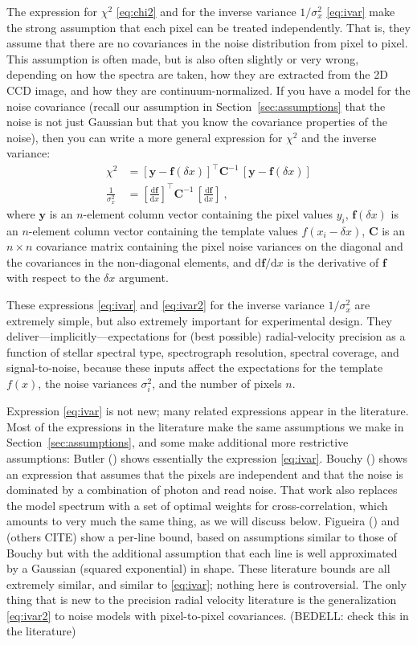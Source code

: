 \documentclass[modern]{aastex631}
\newcommand{\dd}{\mathrm{d}}
\newcommand{\lao}[1]{\boldsymbol{#1}}
\newcommand{\vy}{\lao{y}}
\newcommand{\vf}{\lao{f}}
\newcommand{\vC}{\lao{C}}
\newcommand{\sectionname}{Section}
\newcommand{\secref}[1]{\sectionname~\ref{#1}}
\begin{document}
The expression for $\chi^2$ \eqref{eq:chi2} and for the inverse variance $1/\sigma_x^2$ \eqref{eq:ivar} make the strong assumption that each pixel can be treated independently.
That is, they assume that there are no covariances in the noise distribution from pixel to pixel.
This assumption is often made, but is also often slightly or very wrong, depending on how the spectra are taken, how they are extracted from the 2D CCD image, and how they are continuum-normalized.
If you have a model for the noise covariance (recall our assumption in \secref{sec:assumptions} that the noise is not just Gaussian but that you know the covariance properties of the noise), then you can write a more general expression for $\chi^2$ and the inverse variance:
\begin{align}
    \chi^2 &= [\vy - \vf(\delta x)]^\top\vC^{-1}\,[\vy - \vf(\delta x)]\\
    \frac{1}{\sigma_x^2} &= \left[\frac{\dd\vf}{\dd x}\right]^\top\vC^{-1}\,\left[\frac{\dd\vf}{\dd x}\right]\label{eq:ivar2} ~,
\end{align}
where $\vy$ is an $n$-element column vector containing the pixel values $y_i$,
$\vf(\delta x)$ is an $n$-element column vector containing the template values $f(x_i-\delta x)$,
$\vC$ is an $n\times n$ covariance matrix containing the pixel noise variances on the diagonal and the covariances in the non-diagonal elements,
and $\dd\vf/\dd x$ is the derivative of $\vf$ with respect to the $\delta x$ argument.

These expressions \eqref{eq:ivar} and \eqref{eq:ivar2} for the inverse variance $1/\sigma_x^2$ are extremely simple, but also extremely important for experimental design.
They deliver---implicitly---expectations for (best possible) radial-velocity precision as a function of stellar spectral type, spectrograph resolution, spectral coverage, and signal-to-noise, because these inputs affect the expectations for the template $f(x)$, the noise variances $\sigma_i^2$, and the number of pixels $n$.

Expression \eqref{eq:ivar} is not new; many related expressions appear in the literature.
Most of the expressions in the literature make the same assumptions we make in \secref{sec:assumptions}, and some make additional more restrictive assumptions:
Butler (\citealt{Butler}) shows essentially the expression \eqref{eq:ivar}.
Bouchy (\citealt{Bouchy}) shows an expression that assumes that the pixels are independent and that the noise is dominated by a combination of photon and read noise. 
That work also replaces the model spectrum with a set of optimal weights for cross-correlation, which amounts to very much the same thing, as we will discuss below.
Figueira (\citealt{figuera}) and (others CITE) show a per-line bound, based on assumptions similar to those of Bouchy but with the additional assumption that each line is well approximated by a Gaussian (squared exponential) in shape.
These literature bounds are all extremely similar, and similar to \eqref{eq:ivar}; nothing here is controversial.
The only thing that is new to the precision radial velocity literature is the generalization \eqref{eq:ivar2} to noise models with pixel-to-pixel covariances.
(BEDELL: check this in the literature)
\end{document}

